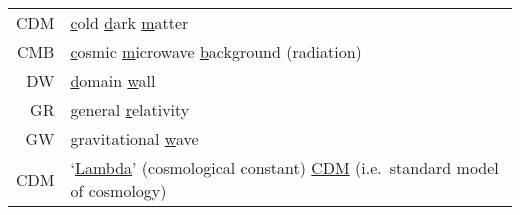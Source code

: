





\begin{tabular*}{\linewidth}{ r l }
    CDM & \underline{c}old \underline{d}ark \underline{m}atter \\
    CMB & \underline{c}osmic \underline{m}icrowave \underline{b}ackground (radiation) \\
    DW& \underline{d}omain \underline{w}all \\
    GR& \underline{g}eneral \underline{r}elativity \\
    GW& \underline{g}ravitational \underline{w}ave\\
    \textLambda{}CDM & `\underline{Lambda}' (cosmological constant) \underline{CDM} (i.e.~standard model of cosmology) \\
\end{tabular*}